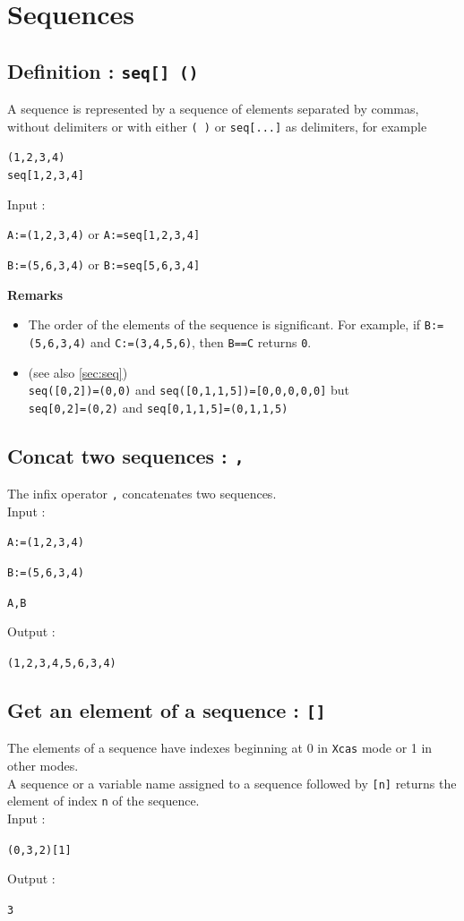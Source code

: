 \documentclass[a4paper,11pt]{book}
\begin{document}
\section{Sequences}
\subsection{Definition : {\tt seq[]  ()}}\index{()}
A sequence is represented by 
a sequence of elements separated by commas, without
delimiters or with either {\tt ( )} or {\tt seq[...]}
as delimiters, for example
\begin{center}
{\tt (1,2,3,4)}\\
{\tt seq[1,2,3,4]}
\end{center}
Input :
\begin{center}{\tt A:=(1,2,3,4)} or {\tt A:=seq[1,2,3,4]}\end{center}
\begin{center}{\tt B:=(5,6,3,4)} or {\tt B:=seq[5,6,3,4]}\end{center}
{\bf Remarks}
\begin{itemize}
\item The order of the elements of the sequence is significant.
For example, if {\tt B:=(5,6,3,4)} and  {\tt C:=(3,4,5,6)}, then
{\tt B==C} returns {\tt 0}.
\item
(see also \ref{sec:seq})\\
{\tt seq([0,2])=(0,0)} and  {\tt seq([0,1,1,5])=[0,0,0,0,0]} but\\
{\tt seq[0,2]=(0,2)} and  {\tt seq[0,1,1,5]=(0,1,1,5)}
\end{itemize}

\subsection{Concat two sequences : {\tt ,}}\index{,}
The infix operator {\tt ,} concatenates two sequences.\\
Input :
\begin{center}{\tt A:=(1,2,3,4)}\end{center}
\begin{center}{\tt B:=(5,6,3,4)}\end{center}
\begin{center}{\tt A,B}\end{center}
Output :
\begin{center}{\tt (1,2,3,4,5,6,3,4)}\end{center}

\subsection{Get an element of a sequence : {\tt []}}\index{[]}
The elements of a sequence have indexes beginning at 0 in {\tt Xcas}
mode or 1 in other modes.\\
A sequence or a variable name assigned to a sequence
followed by {\tt [n]} returns the element of index {\tt n} of the sequence.\\
Input :
\begin{center}{\tt (0,3,2)[1]}\end{center}
Output :
\begin{center}{\tt 3}\end{center}
\end{document}
